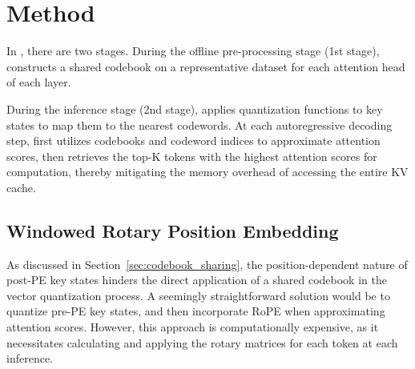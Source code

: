 \section{Method}




In {\name}, there are two stages.
During the offline pre-processing stage (1st stage), {\name} constructs a shared codebook on a representative dataset for each attention head of each layer.

During the inference stage (2nd stage), {\name} applies quantization functions to key states to map them to the nearest codewords.
At each autoregressive decoding step, {\name} first utilizes codebooks and codeword indices to approximate attention scores, then retrieves the top-K tokens with the highest attention scores for computation, thereby mitigating the memory overhead of accessing the entire KV cache.

\subsection{Windowed Rotary Position Embedding}

As discussed in Section~\ref{sec:codebook_sharing}, the position-dependent nature of post-PE key states hinders the direct application of a shared codebook in the vector quantization process.
A seemingly straightforward solution would be to quantize pre-PE key states, and then incorporate RoPE when approximating attention scores.
However, this approach is computationally expensive, as it necessitates calculating and applying the rotary matrices for each token at each inference.


